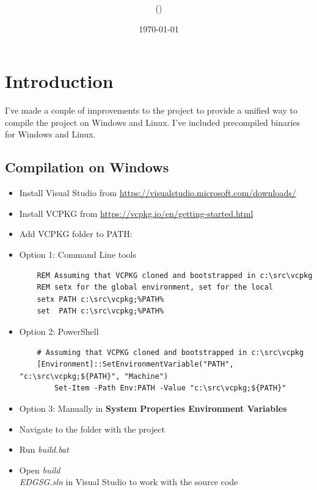 \documentclass[12pt,a4paper,english]{article}
\title{\mySubject\\\myTitle}
\author{\myName (\myEmail)}
\date{\today}
\begin{document}
\section{Introduction}
I've made a couple of improvements to the project to provide a unified way to compile the project on Windows and Linux.
I've included precompiled binaries for Windows and Linux.

\subsection{Compilation on Windows}

\begin{itemize}
    \item Install Visual Studio from \url{https://visualstudio.microsoft.com/downloads/}
    \item Install VCPKG from \url{https://vcpkg.io/en/getting-started.html}
    \item Add VCPKG folder to PATH:
    \item Option 1: Command Line tools

          \begin{verbatim}
    REM Assuming that VCPKG cloned and bootstrapped in c:\src\vcpkg
    REM setx for the global environment, set for the local
    setx PATH c:\src\vcpkg;%PATH%
    set  PATH c:\src\vcpkg;%PATH%
    \end{verbatim}

    \item Option 2: PowerShell
          \begin{verbatim}
    # Assuming that VCPKG cloned and bootstrapped in c:\src\vcpkg
    [Environment]::SetEnvironmentVariable("PATH", "c:\src\vcpkg;${PATH}", "Machine")
        Set-Item -Path Env:PATH -Value "c:\src\vcpkg;${PATH}"
    \end{verbatim}

    \item Option 3: Manually in \textbf{System Properties \text{-->} Environment Variables}
    \item Navigate to the folder with the project
    \item Run \textit{build.bat}
    \item Open \textit{build\\EDGSG.sln} in Visual Studio to work with the source code
\end{itemize}
\end{document}
